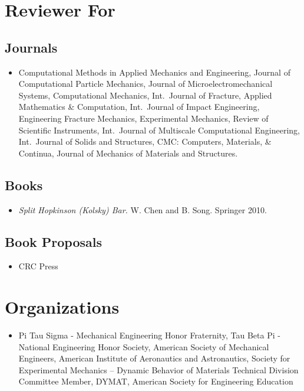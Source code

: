 \section*{Reviewer For}

\subsection*{Journals}

\begin{itemize}
    \item Computational Methods in Applied Mechanics and Engineering, Journal of Computational Particle Mechanics, Journal of Microelectromechanical Systems, Computational Mechanics, Int.~Journal of Fracture, Applied Mathematics \& Computation, Int.~Journal of Impact Engineering, Engineering Fracture Mechanics, Experimental Mechanics,  Review of Scientific Instruments, Int.~Journal of Multiscale Computational Engineering, Int.~Journal of Solids and Structures, CMC: Computers, Materials, \& Continua, Journal of Mechanics of Materials and Structures.
\end{itemize}

\subsection*{Books}

\begin{itemize}
    \item {\it Split Hopkinson (Kolsky) Bar.}  W. Chen and B. Song.  Springer 2010.
\end{itemize}

\subsection*{Book Proposals}

\begin{itemize}
    \item CRC Press
\end{itemize}

\section*{Organizations}

\begin{itemize}
    \item Pi Tau Sigma - Mechanical Engineering Honor Fraternity, Tau Beta Pi - National Engineering Honor Society, American Society of Mechanical Engineers, American Institute of Aeronautics and Astronautics, Society for Experimental Mechanics -- Dynamic Behavior of Materials Technical Division Committee Member, DYMAT, American Society for Engineering Education
\end{itemize}

